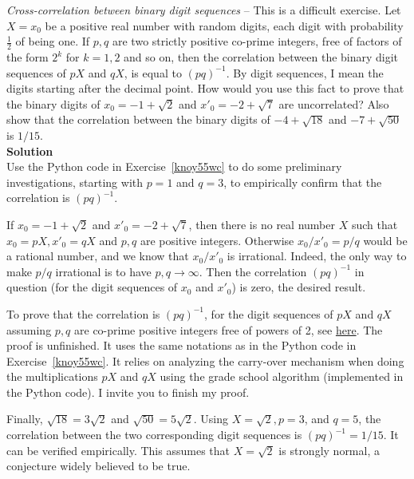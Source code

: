 \documentclass[oneside,10pt]{book}
\begin{document}
\begin{Exercise}\label{pqcorr} {\em Cross-correlation between binary digit sequences} -- This is a difficult exercise. Let 
 $X=x_0$ be a positive real number with random digits, each digit with probability $\frac{1}{2}$ of being one. If $p, q$ are two strictly positive co-prime integers, free of factors of the form $2^k$ for $k=1,2$ and so on, then the correlation between the binary digit sequences of $pX$ and $qX$, is equal to $(pq)^{-1}$. By digit sequences, I mean the digits starting after the decimal point.  
How would you use this fact to prove that the binary digits of $x_0= -1+\sqrt{2}$ and $x'_0=-2 +\sqrt{7}$ are
 uncorrelated? Also show that the correlation between the binary digits of $-4 + \sqrt{18}$ and $-7+\sqrt{50}$ is $1/15$.
\vspace{1ex} \\ 
{\bf Solution} \\
Use the Python code in Exercise~\ref{knoy55wc} to do some preliminary investigations, starting with $p=1$ and $q=3$, to empirically confirm that the correlation is $(pq)^{-1}$. 

If $x_0= -1+\sqrt{2}$ and $x'_0=-2 +\sqrt{7}$, then there is no real number $X$ such that
 $x_0=pX, x'_0=qX$ and $p, q$ are positive integers. Otherwise $x_0/x'_0 = p/q$ would be a rational number, and we know
 that $x_0/x'_0$ is irrational. Indeed, the only way to make $p/q$ irrational is to have $p, q\rightarrow\infty$. Then the correlation
  $(pq)^{-1}$ in question (for the digit sequences of $x_0$ and $x'_0$) is zero, the desired result. 

To prove that the correlation is $(pq)^{-1}$, for the digit sequences of $pX$ and $qX$ assuming $p,q$ are co-prime positive integers free of powers of 2,
 see \href{https://stats.stackexchange.com/questions/450922/cross-correlations-in-digit-distributions}{here}. The proof is unfinished. It uses the same notations as in the Python code in Exercise~\ref{knoy55wc}. It relies on analyzing the carry-over mechanism when doing the multiplications $pX$ and $qX$ using the grade school algorithm (implemented in the Python code). I invite you to finish my proof. 

Finally, $\sqrt{18} = 3\sqrt{2}$ and $\sqrt{50} = 5\sqrt{2}$. Using $X=\sqrt{2}, p=3$, and $q=5$, the correlation between the two corresponding digit sequences is $(pq)^{-1}= 1/15$. It can be verified empirically. This assumes that $X=\sqrt{2}$ is \textcolor{index}{strongly normal}, a conjecture widely believed to be true.
\end{Exercise}
\end{document}
